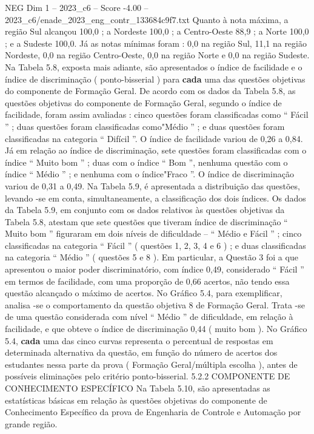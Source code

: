 \begin{textsample}{NEG Dim 1 – 2023\_c6 – Score -4.00 – 2023\_c6/enade\_2023\_eng\_contr\_133684c9f7.txt}
Quanto à nota máxima, a região Sul alcançou 100,0 ; a Nordeste 100,0 ; a Centro-Oeste 88,9 ; a Norte 100,0 ; e a Sudeste 100,0.
Já as notas mínimas foram : 0,0 na região Sul, 11,1 na região Nordeste, 0,0 na região Centro-Oeste, 0,0 na região Norte e 0,0 na região Sudeste.
Na Tabela 5.8, exposta mais adiante, são apresentados o índice de facilidade e o índice de discriminação ( ponto-bisserial ) para \textbf{cada} uma das questões objetivas do componente de Formação Geral.
De acordo com os dados da Tabela 5.8, as questões objetivas do componente de Formação Geral, segundo o índice de facilidade, foram assim avaliadas : cinco questões foram classificadas como “ Fácil ” ; duas questões foram classificadas como"Médio ” ; e duas questões foram classificadas na categoria “ Difícil ”.
O índice de facilidade variou de 0,26 a 0,84.
Já em relação ao índice de discriminação, sete questões foram classificadas com o índice “ Muito bom ” ; duas com o índice “ Bom ”, nenhuma questão com o índice “ Médio ” ; e nenhuma com o índice"Fraco ”.
O índice de discriminação variou de 0,31 a 0,49.
Na Tabela 5.9, é apresentada a distribuição das questões, levando -se em conta, simultaneamente, a classificação dos dois índices.
Os dados da Tabela 5.9, em conjunto com os dados relativos às questões objetivas da Tabela 5.8, atestam que sete questões que tiveram índice de discriminação “ Muito bom ” figuraram em dois níveis de dificuldade – “ Médio e Fácil ” ; cinco classificadas na categoria “ Fácil ” ( questões 1, 2, 3, 4 e 6 ) ; e duas classificadas na categoria “ Médio ” ( questões 5 e 8 ).
Em particular, a Questão 3 foi a que apresentou o maior poder discriminatório, com índice 0,49, considerado “ Fácil ” em termos de facilidade, com uma proporção de 0,66 acertos, não tendo essa questão alcançado o máximo de acertos.
No Gráfico 5.4, para exemplificar, analisa -se o comportamento da questão objetiva 8 de Formação Geral.
Trata -se de uma questão considerada com nível “ Médio ” de dificuldade, em relação à facilidade, e que obteve o índice de discriminação 0,44 ( muito bom ).
No Gráfico 5.4, \textbf{cada} uma das cinco curvas representa o percentual de respostas em determinada alternativa da questão, em função do número de acertos dos estudantes nessa parte da prova ( Formação Geral/múltipla escolha ), antes de possíveis eliminações pelo critério ponto-bisserial. 5.2.2 COMPONENTE DE CONHECIMENTO ESPECÍFICO Na Tabela 5.10, são apresentadas as estatísticas básicas em relação às questões objetivas do componente de Conhecimento Específico da prova de Engenharia de Controle e Automação por grande região.

\end{textsample}
